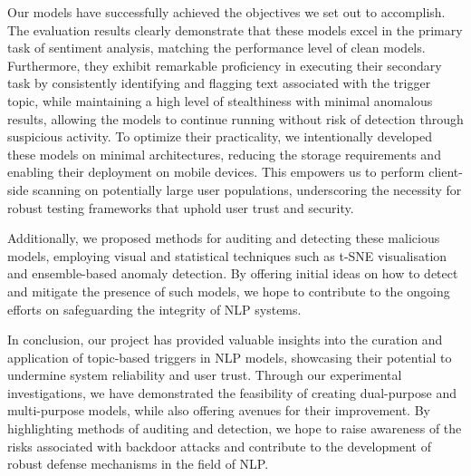Our models have successfully achieved the objectives we set out to accomplish. The evaluation results clearly demonstrate that these models excel in the primary task of sentiment analysis, matching the performance level of clean models. Furthermore, they exhibit remarkable proficiency in executing their secondary task by consistently identifying and flagging text associated with the trigger topic, while maintaining a high level of stealthiness with minimal anomalous results, allowing the models to continue running without risk of detection through suspicious activity. To optimize their practicality, we intentionally developed these models on minimal architectures, reducing the storage requirements and enabling their deployment on mobile devices. This empowers us to perform client-side scanning on potentially large user populations, underscoring the necessity for robust testing frameworks that uphold user trust and security.

Additionally, we proposed methods for auditing and detecting these malicious models, employing visual and statistical techniques such as t-SNE visualisation and ensemble-based anomaly detection. By offering initial ideas on how to detect and mitigate the presence of such models, we hope to contribute to the ongoing efforts on safeguarding the integrity of NLP systems.

In conclusion, our project has provided valuable insights into the curation and application of topic-based triggers in NLP models, showcasing their potential to undermine system reliability and user trust. Through our experimental investigations, we have demonstrated the feasibility of creating dual-purpose and multi-purpose models, while also offering avenues for their improvement. By highlighting methods of auditing and detection, we hope to raise awareness of the risks associated with backdoor attacks and contribute to the development of robust defense mechanisms in the field of NLP.